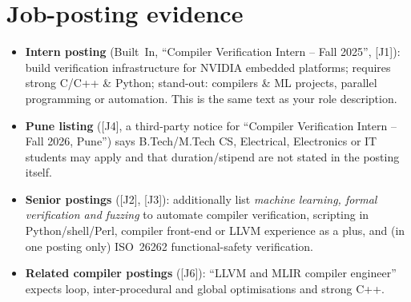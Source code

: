 \documentclass[10pt,a4paper,openany,oneside]{report}
\newcommand{\prio}[1]{\texorpdfstring{\ifcase#1\or{\color{gold}\ding{72}}\or{\color{gold}\ding{72}\ding{72}}\or{\color{gold}\ding{72}\ding{72}\ding{72}}\fi}{}}
\begin{document}
\section{Job-posting evidence \prio{2}}
\begin{itemize}
\item \textbf{Intern posting} (Built~In, ``Compiler Verification Intern -- Fall 2025'', [J1]): build verification infrastructure for NVIDIA embedded platforms; requires strong
 C/C++ \& Python; stand-out: compilers \& ML projects, parallel programming or automation. This is the same text as your role description.
\item \textbf{Pune listing} ([J4], a third-party notice for ``Compiler Verification Intern -- Fall 2026, Pune'') says B.Tech/M.Tech CS, Electrical, Electronics or IT students may apply
 and that duration/stipend are not stated in the posting itself.
\item \textbf{Senior postings} ([J2], [J3]): additionally list \emph{machine learning, formal verification and fuzzing} to automate compiler verification,
 scripting in Python/shell/Perl, compiler front-end or LLVM experience as a plus, and (in one posting only) ISO~26262 functional-safety verification.
\item \textbf{Related compiler postings} ([J6]): ``LLVM and MLIR compiler engineer'' expects loop, inter-procedural and global optimisations and strong C++.
\end{itemize}
\end{document}
